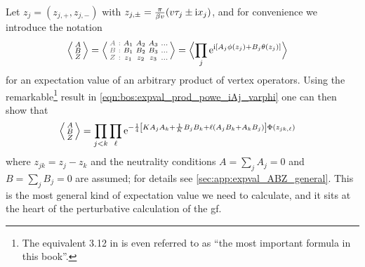 Let $z_j=(z_{j,+}, z_{j,-})$ with $z_{j,\pm} = \frac{\pi}{\beta v} \kla*{v\tau_j \pm \i x_j}$, and for convenience we introduce the notation%
\begin{align*}
\bra[\Big]{\abx{A}{B}{Z}} &= \bra[\Big]{\zabx{A_1 & A_2 & A_3 & \dots}{B_1 & B_2 & B_3 & \dots}{z_1 & z_2 & z_3 & \dots}} = \bra[\Big]{\prod_j \powe{\i \klb*{A_j \phi(z_j) + B_j\theta(z_j)}}}
\end{align*}
for an expectation value of an arbitrary product of vertex operators.
Using the remarkable\footnote{The equivalent \seqnl{} 3.12 in \cite{Gogolin_1999} is even referred to as ``the most important formula in this book''.} result in \autoref{eqn:bos:expval_prod_powe_iAj_varphi} one can then show that
\begin{align}
\bra[\Big]{\abx{A}{B}{Z}} &= \prod_{j<k} \prod_\ell \powe{-\frac{1}{4} \klb*{KA_jA_k + \frac{1}{K} B_jB_k + \ell \kla*{A_jB_k + A_kB_j}} \Phi(z_{jk,\ell})} \label{eqn:ell:gf:expval_prod_ABZ}
\end{align}
where $z_{jk} = z_j-z_k$ and the neutrality conditions $A=\sum_jA_j = 0$ and $B=\sum_jB_j=0$ are assumed; for details see \autoref{sec:app:expval_ABZ_general}.
This is the most general kind of expectation value we need to calculate, and it sits at the heart of the perturbative calculation of the \gls{gf}.
